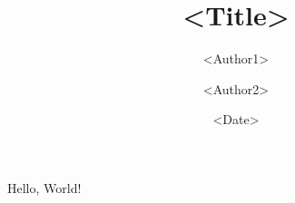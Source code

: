 \documentclass{tudaexercise}
\author{<Author1>\and <Author2>}
\title{<Title>}
\date{<Date>}
\begin{document}
    \maketitle{}

    Hello, World!
\end{document}
